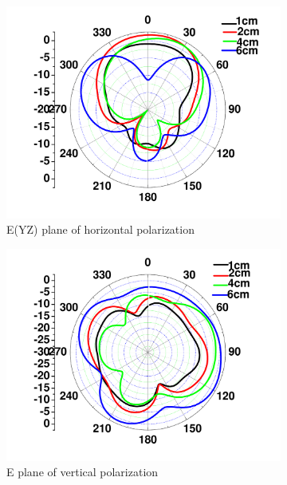 \documentclass[journal]{IEEEtran}
\begin{document}
\begin{figure}[!htb]
\centering
\begin{subfigure}[b]{0.24\textwidth}
\includegraphics[width=\textwidth]{figs/6a.pdf}
\caption{E(YZ) plane of horizontal polarization}
\label{fig:6a}	
\end{subfigure}		
\begin{subfigure}[b]{0.24\textwidth}
\includegraphics[width=\textwidth]{figs/6b.pdf}
\caption{E plane of vertical polarization}
\label{fig:6b}
\end{subfigure}
\begin{subfigure}[b]{0.24\textwidth}

\end{subfigure}
\end{figure}
\end{document}
